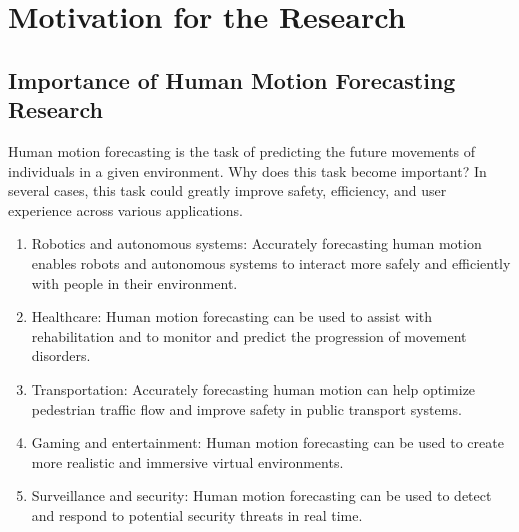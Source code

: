 \section{Motivation for the Research}\label{1:motivation} %
\subsection{Importance of Human Motion Forecasting Research}
Human motion forecasting is the task of predicting the future movements of individuals in a given environment. Why does this task become important? In several cases, this task could greatly improve safety, efficiency, and user experience across various applications.
\begin{enumerate}
    
    \item Robotics and autonomous systems: Accurately forecasting human motion enables robots and autonomous systems to interact more safely and efficiently with people in their environment.
    \item Healthcare: Human motion forecasting can be used to assist with rehabilitation and to monitor and predict the progression of movement disorders.
    \item Transportation: Accurately forecasting human motion can help optimize pedestrian traffic flow and improve safety in public transport systems.
    \item Gaming and entertainment: Human motion forecasting can be used to create more realistic and immersive virtual environments.
    \item Surveillance and security: Human motion forecasting can be used to detect and respond to potential security threats in real time.
\end{enumerate}

